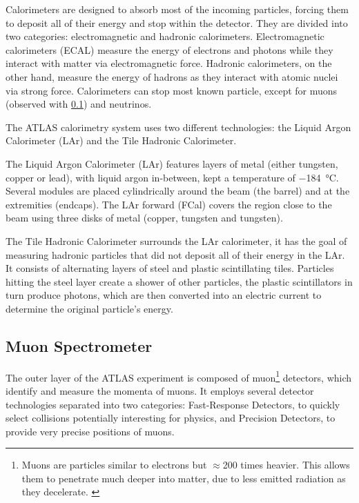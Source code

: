 Calorimeters are designed to absorb most of the incoming particles, forcing them to deposit all of their energy and stop within the detector. They are divided into two categories: electromagnetic and hadronic calorimeters. Electromagnetic calorimeters (ECAL) measure the energy of electrons and photons while they interact with matter via electromagnetic force. Hadronic calorimeters, on the other hand, measure the energy of hadrons as they interact with atomic nuclei via strong force. Calorimeters can stop most known particle, except for muons (observed with \ref{sec:muon_spectrometer}) and neutrinos.

The ATLAS calorimetry system uses two different technologies: the Liquid Argon Calorimeter (LAr) and the Tile Hadronic Calorimeter.

The Liquid Argon Calorimeter (LAr) features layers of metal (either tungsten, copper or lead), with liquid argon in-between, kept a temperature of \qty{-184}{\degreeCelsius}. Several modules are placed cylindrically around the beam (the barrel) and at the extremities (endcaps). The LAr forward (FCal) covers the region close to the beam using three disks of metal (copper, tungsten and tungsten).

The Tile Hadronic Calorimeter surrounds the LAr calorimeter, it has the goal of measuring hadronic particles that did not deposit all of their energy in the LAr. It consists of alternating layers of steel and plastic scintillating tiles. Particles hitting the steel layer create a shower of other particles, the plastic scintillators in turn produce photons, which are then converted into an electric current to determine the original particle's energy.

\subsection{Muon Spectrometer}\label{sec:muon_spectrometer}

The outer layer of the ATLAS experiment is composed of muon\footnote{Muons are particles similar to electrons but \(\approx\)200 times heavier. This allows them to penetrate much deeper into matter, due to less emitted radiation as they decelerate. \label{footnote:muons}} detectors, which identify and measure the momenta of muons. It employs several detector technologies separated into two categories: Fast-Response Detectors, to quickly select collisions potentially interesting for physics, and Precision Detectors, to provide very precise positions of muons.

